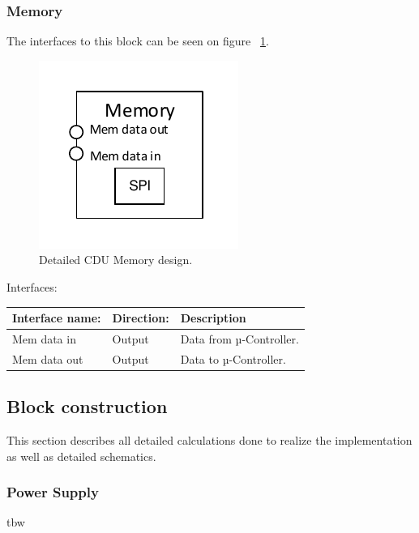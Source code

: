 \subsubsection{Memory}
The interfaces to this block can be seen on figure ~\ref{fig:CDUM}.\\
\begin{figure}[H]
	\centering
	\includegraphics[scale=1]{billeder/CDUM}
	\caption{Detailed CDU Memory design.}
	\label{fig:CDUM}
\end{figure}
Interfaces:
\begin{table}[H]
	\centering
	\begin{tabular}{|p{3cm} |p{3cm}| p{8cm}| }
		\hline
		Interface name: & Direction: 	& Description \\ \hline
		Mem data in		&Output & Data from µ-Controller. \\\hline 
		Mem data out	&Output & Data to µ-Controller. \\\hline  
	\end{tabular}
\end{table}

\subsection{Block construction}
This section describes all detailed calculations done to realize the implementation as well as detailed schematics.\\
\subsubsection{Power Supply}
tbw
%

